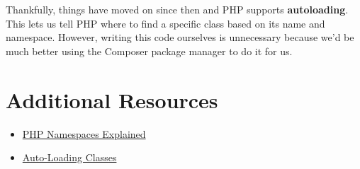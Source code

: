 Thankfully, things have moved on since then and PHP supports \textbf{autoloading}. This lets us tell PHP where to find a specific class based on its name and namespace. However, writing this code ourselves is unnecessary because we'd be much better using the Composer package manager to do it for us.

\section{Additional Resources}

\begin{itemize}[leftmargin=*]
    \item \href{https://daylerees.com/php-namespaces-explained/}{PHP Namespaces Explained}
    \item \href{http://php.net/manual/en/language.oop5.autoload.php}{Auto-Loading Classes}
\end{itemize}
